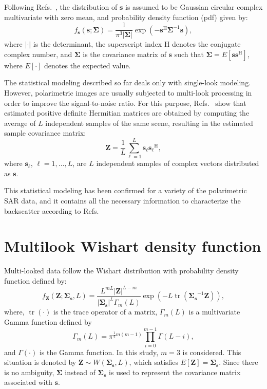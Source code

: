 \documentclass[conference]{IEEEtran}
\DeclareMathOperator{\traco}{tr}
\begin{document}
Following Refs.~\cite{good, lee}, the distribution of $\mathbf{s}$ is assumed to be  Gaussian circular complex multivariate with zero mean, and probability density function (pdf) given by:
\begin{equation}
    f_{\mathbf{s}}(\mathbf{s};\mathbf{\Sigma})=\frac{1}{\pi^3|\mathbf{\Sigma}|} \exp(-\mathbf{s}^\text{H}\mathbf{\Sigma}^{-1}\mathbf{s}),
    \label{eq_02}
\end{equation}
where $|\cdot|$ is the determinant, 
the superscript index $\text{H}$ denotes the conjugate complex number, 
and $\mathbf{\Sigma}$ is the covariance matrix of $\mathbf{s}$ such that $\mathbf{\Sigma}=E[\mathbf{ss}^\text{H}]$, where $E[\cdot]$ denotes the expected value. 
 
The statistical modeling described so far deals only with single-look modeling. However, polarimetric images are usually subjected to multi-look processing in order to improve the signal-to-noise ratio. 
For this purpose, Refs.~\cite{good, ade} show that estimated positive definite Hermitian matrices are obtained by computing the average of $L$ independent samples of the same scene, resulting in the estimated sample covariance matrix:
\begin{equation}
    \mathbf{Z}=\frac{1}{L}\sum_{\ell=1}^{L} {\mathbf{s}_\ell}{\mathbf{s}_\ell}^\text{H},
    \label{eq_03}
\end{equation}
where $\mathbf{s}_\ell$, $\ell = 1, \dots, L$, are $L$ independent samples of complex vectors distributed as $\mathbf{s}$.

This statistical modeling has been confirmed for a variety of the polarimetric SAR data, and it contains all the necessary information to characterize the backscatter according to Refs.~\cite{sarabendi,mfp}
\section{Multilook Wishart density function}\label{sec_03}

Multi-looked data follow the Wishart distribution with probability density function defined by:
\begin{equation}
    f_{\mathbf{Z}}(\mathbf{Z};\mathbf{\Sigma_{s}},L)=\frac{L^{mL}|\mathbf{Z}|^{L-m}}{|\mathbf{\Sigma_{s}}|^{L}\Gamma_m(L)} \exp(-L\traco(\mathbf{\Sigma_{s}}^{-1}\mathbf{Z})),
    \label{eq_04}
\end{equation} 
where, $\traco(\cdot)$ is the trace operator of a matrix, $\Gamma_m(L)$ is a multivariate Gamma function defined by
\begin{equation*}
	\Gamma_m(L)=\pi^{\frac{1}{2}m(m-1)} \prod_{i=0}^{m-1}\Gamma(L-i),
\end{equation*}
and $\Gamma(\cdot)$ is the Gamma function.
In this study, $m=3$ is considered. This situation is denoted by $\mathbf{Z}\sim W(\mathbf{\Sigma_{s}}, L)$, which satisfies $E[\mathbf{Z}]=\mathbf{\Sigma_{s}}$. 
Since there is no ambiguity, $\mathbf{\Sigma}$ instead of $\mathbf{\Sigma_{s}}$ is used  to represent the covariance matrix associated with $\mathbf{s}$.
\end{document}
